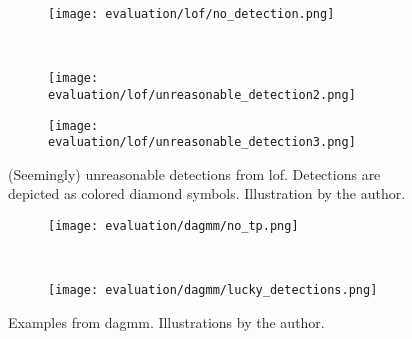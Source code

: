 \begin{figure}[htp!]
    \begin{subfigure}[b]{\linewidth}
        \centering
        \texttt{[image: evaluation/lof/no\_detection.png]}
    \end{subfigure}%
    \\
    \begin{subfigure}[b]{\linewidth}
        \centering
        \texttt{[image: evaluation/lof/unreasonable\_detection2.png]}
    \end{subfigure}
\end{figure}

\begin{figure}[htp!]
    \ContinuedFloat{}
    \begin{subfigure}[b]{\linewidth}
        \centering
        \texttt{[image: evaluation/lof/unreasonable\_detection3.png]}
    \end{subfigure}
    \caption[(Seemingly) unreasonable detections from \gls{lof}.]{(Seemingly) unreasonable detections from \gls{lof}. Detections are
    depicted as colored diamond symbols. Illustration by the author.}\label{fig:lof-output}
\end{figure}

\begin{figure}[htp!]
    \begin{subfigure}[b]{\linewidth}
        \centering
        \texttt{[image: evaluation/dagmm/no\_tp.png]}
    \end{subfigure}%
    \\
    \begin{subfigure}[b]{\linewidth}
        \centering
        \texttt{[image: evaluation/dagmm/lucky\_detections.png]}
    \end{subfigure}
    \caption[Examples from \gls{dagmm}.]{Examples from \gls{dagmm}. Illustrations by the author.}\label{fig:dagmm-output}
\end{figure}

